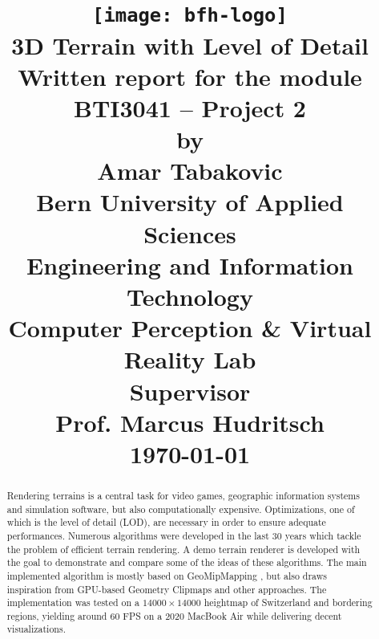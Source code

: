 \documentclass[10pt,a4paper]{report}
\begin{document}
\title{
\vspace{-80px}
\texttt{[image: bfh-logo]}\\
\vspace{80px}
\huge\textsf{\textbf{3D Terrain with Level of Detail}}\\
\vspace{50px}
\large{Written report for the module\\
BTI3041 -- Project 2\\ 
by\\}
\vspace{20px}
\Large{Amar Tabakovic\\}
\vspace{40px}
\large{
\textbf{Bern University of Applied Sciences}\\
  Engineering and Information Technology\\
  Computer Perception \& Virtual Reality Lab
\\
\vspace{20px}
\textbf{Supervisor}\\
Prof. Marcus Hudritsch}\\
\vspace{30px}
\today
}

\date{}
\maketitle

\begin{abstract}
 Rendering terrains is a central task for video games, geographic information systems and simulation software, 
 but also computationally expensive. Optimizations, one of which is the level of detail (LOD),
 are necessary in order to ensure adequate performances.
 Numerous algorithms were developed in the last 30 years which tackle the problem of efficient terrain rendering.
 A demo terrain renderer is developed with the goal to demonstrate and compare some of the ideas of these algorithms.
 The main implemented algorithm is mostly based on GeoMipMapping \cite{geomipmapping}, but also draws inspiration from GPU-based Geometry Clipmaps \cite{gpugeomclipmaps}
 and other approaches.
 The implementation was tested on a $14000 \times 14000$ heightmap of Switzerland and bordering regions, yielding around 
 60 FPS on a 2020 MacBook Air while delivering decent visualizations.
\end{abstract}

\tableofcontents

\listoftables
\listoffigures
\lstlistoflistings











\end{document}
